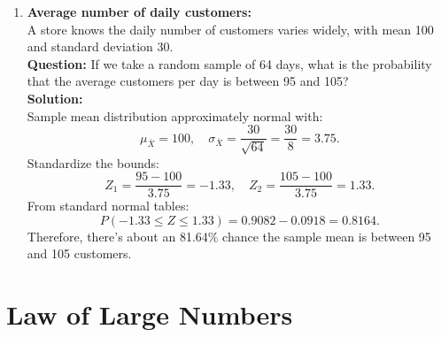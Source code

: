 \documentclass{book}
\begin{document}
\begin{enumerate}[label=Exercise \arabic*:]
    \item \textbf{Average number of daily customers:} \\
    A store knows the daily number of customers varies widely, with mean 100 and standard deviation 30. \\
    \textbf{Question:} If we take a random sample of 64 days, what is the probability that the average customers per day is between 95 and 105? \\
    \textbf{Solution:} \\
    Sample mean distribution approximately normal with:
    \[
    \mu_{\bar{X}} = 100, \quad \sigma_{\bar{X}} = \frac{30}{\sqrt{64}} = \frac{30}{8} = 3.75.
    \]
    Standardize the bounds:
    \[
    Z_1 = \frac{95 - 100}{3.75} = -1.33, \quad Z_2 = \frac{105 - 100}{3.75} = 1.33.
    \]
    From standard normal tables:
    \[
    P(-1.33 \leq Z \leq 1.33) = 0.9082 - 0.0918 = 0.8164.
    \]
    Therefore, there's about an 81.64\% chance the sample mean is between 95 and 105 customers.

\end{enumerate}

\section*{Law of Large Numbers}
\end{document}
